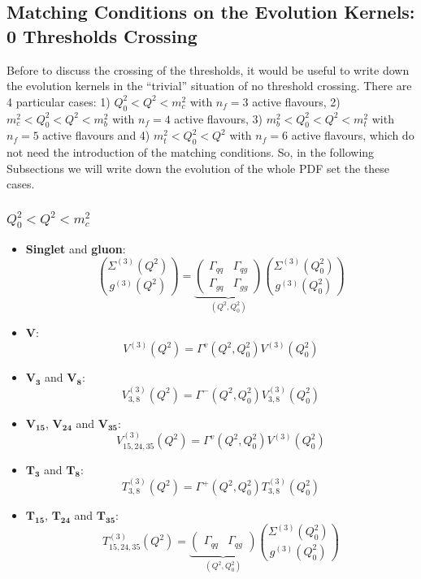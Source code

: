\documentclass[10pt,a4paper]{article}
\begin{document}
\subsection{Matching Conditions on the Evolution Kernels: 0 Thresholds Crossing}

Before to discuss the crossing of the thresholds, it would be useful
to write down the evolution kernels in the ``trivial'' situation of no
threshold crossing. There are 4 particular cases: 1) $Q_0^2<Q^2<m_c^2$
with $n_f=3$ active flavours, 2) $m_c^2<Q_0^2<Q^2<m_b^2$ with $n_f=4$
active flavours, 3) $m_b^2<Q_0^2<Q^2<m_t^2$ with $n_f=5$ active
flavours and 4) $m_t^2<Q_0^2<Q^2$ with $n_f=6$ active flavours, which
do not need the introduction of the matching conditions. So, in the
following Subsections we will write down the evolution of the whole
PDF set the these cases.

\subsubsection{$Q_0^2<Q^2<m_c^2$}
\begin{itemize}
\item \textbf{Singlet} and \textbf{gluon}:
\begin{equation}
{\Sigma^{(3)}(Q^2) \choose g^{(3)}(Q^2)} =\underbrace{\begin{pmatrix} \Gamma_{qq}& \Gamma_{qg} \\ \Gamma_{gq}& \Gamma_{gg}\end{pmatrix}}_{(Q^2,Q_0^2)}{\Sigma^{(3)}(Q_0^2) \choose g^{(3)}(Q_0^2)}
\end{equation}
\item $\mathbf{V}$:
\begin{equation}
V^{(3)}(Q^2)=\Gamma^{v}(Q^2,Q_0^2)V^{(3)}(Q^2_0)
\end{equation}
\item $\mathbf{V_3}$ and $\mathbf{V_8}$:
\begin{equation}
V^{(3)}_{3,8}(Q^2)=\Gamma^{-}(Q^2,Q_0^2)V^{(3)}_{3,8}(Q^2_0)
\end{equation}
\item $\mathbf{V_{15}}$, $\mathbf{V_{24}}$ and $\mathbf{V_{35}}$:
\begin{equation}
V_{15,24,35}^{(3)}(Q^2)=\Gamma^{v}(Q^2,Q^2_0)V^{(3)}(Q_0^2)
\end{equation}
\item $\mathbf{T_3}$ and $\mathbf{T_8}$:
\begin{equation}
T^{(3)}_{3,8}(Q^2)=\Gamma^{+}(Q^2,Q_0^2)T^{(3)}_{3,8}(Q^2_0)
\end{equation}
\item $\mathbf{T_{15}}$, $\mathbf{T_{24}}$ and $\mathbf{T_{35}}$:
\begin{equation}
T_{15,24,35}^{(3)}(Q^2) = \underbrace{\begin{pmatrix} \Gamma_{qq} & \Gamma_{qg}\end{pmatrix}}_{(Q^2,Q_0^2)}{\Sigma^{(3)}(Q_0^2) \choose g^{(3)}(Q_0^2)}
\end{equation}
\end{itemize}
\end{document}

